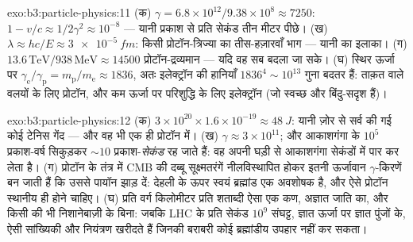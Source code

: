 \begin{solution}{exo:b3:particle-physics:11}
(क) $\gamma = 6.8\times10^{12}/9.38\times10^{8} \approx 7250$:
$1 - v/c \approx 1/2\gamma^2 \approx 10^{-8}$ --- यानी प्रकाश से
प्रति सेकंड तीन मीटर पीछे। (ख) $\lambda \approx hc/E \approx
\qty{3e-5}{fm}$: किसी प्रोटॉन-त्रिज्या का तीस-हज़ारवाँ भाग --- यानी
 का इलाका। (ग) $13.6\,\text{TeV}/938\,\text{MeV} \approx
14500$ प्रोटॉन-द्रव्यमान --- यदि वह सब बदला जा सके। (घ) स्थिर
ऊर्जा पर $\gamma_{\text{e}}/\gamma_{\text{p}} =
m_{\text{p}}/m_{\text{e}} \approx 1836$, अतः इलेक्ट्रॉन की हानियाँ
$1836^4 \sim 10^{13}$ गुना बदतर हैं: ताक़त वाले वलयों के लिए प्रोटॉन,
और कम ऊर्जा पर परिशुद्धि के लिए इलेक्ट्रॉन (जो स्वच्छ और बिंदु-सदृश हैं)।
\end{solution}

\begin{solution}{exo:b3:particle-physics:12}
(क) $3\times10^{20}\times1.6\times10^{-19} \approx \qty{48}{J}$:
यानी ज़ोर से सर्व की गई कोई टेनिस गेंद --- और वह भी एक ही प्रोटॉन में।
(ख) $\gamma \approx
3\times10^{11}$; और आकाशगंगा के $10^{5}$ प्रकाश-वर्ष सिकुड़कर
${\sim}10$ प्रकाश-\emph{सेकंड} रह जाते हैं: वह अपनी घड़ी से आकाशगंगा
सेकंडों में पार कर लेता है। (ग) प्रोटॉन के तंत्र में CMB की
दब्बू सूक्ष्मतरंगें नीलविस्थापित होकर इतनी ऊर्जावान $\gamma$-किरणें
बन जाती हैं कि उससे पायॉन झाड़ दें: देहली के ऊपर स्वयं ब्रह्मांड
एक अवशोषक है, और ऐसे प्रोटॉन स्थानीय ही होने चाहिए। (घ) प्रति वर्ग
किलोमीटर प्रति शताब्दी ऐसा एक कण, अज्ञात जाति का, और किसी की भी
निशानेबाज़ी के बिना: जबकि LHC के प्रति सेकंड $10^{9}$ संघट्ट, ज्ञात
ऊर्जा पर ज्ञात पुंजों के, ऐसी सांख्यिकी और नियंत्रण खरीदते हैं जिनकी
बराबरी कोई ब्रह्मांडीय उपहार नहीं कर सकता।
\end{solution}

